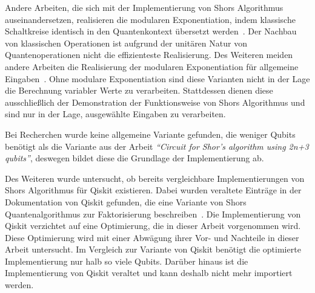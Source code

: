 Andere Arbeiten, die sich mit der Implementierung von Shors Algorithmus auseinandersetzen,
realisieren die modularen Exponentiation, 
indem klassische Schaltkreise identisch in den Quantenkontext übersetzt werden~\cite{Vedral_1996}.
Der Nachbau von klassischen Operationen ist aufgrund der unitären Natur von Quantenoperationen nicht die effizienteste Realisierung.
Des Weiteren meiden andere Arbeiten die Realisierung der modularen Exponentiation für allgemeine Eingaben~\cite{9376169,9686492}. 
Ohne modulare Exponentiation sind diese Varianten nicht in der Lage die Berechnung variabler Werte zu verarbeiten.
Stattdessen dienen diese ausschließlich der Demonstration der Funktionsweise von Shors Algorithmus und
sind nur in der Lage, ausgewählte Eingaben zu verarbeiten.

Bei Recherchen wurde keine allgemeine Variante gefunden,
die weniger Qubits benötigt als die Variante aus der Arbeit \textit{"`Circuit for Shor’s algorithm using 2n+3 qubits"'},
deswegen bildet diese die Grundlage der Implementierung ab.

Des Weiteren wurde untersucht, 
ob bereits vergleichbare Implementierungen von Shors Algorithmus für Qiskit existieren. 
Dabei wurden veraltete Einträge in der Dokumentation von Qiskit gefunden, 
die eine Variante von Shors Quantenalgorithmus zur Faktorisierung beschreiben~\cite{QiskitShorImplementations}. 
Die Implementierung von Qiskit verzichtet auf eine Optimierung, die in dieser Arbeit vorgenommen wird. 
Diese Optimierung wird mit einer Abwägung ihrer Vor- und Nachteile in dieser Arbeit untersucht. 
Im Vergleich zur Variante von Qiskit benötigt die optimierte Implementierung nur halb so viele Qubits. 
Darüber hinaus ist die Implementierung von Qiskit veraltet und kann deshalb nicht mehr importiert werden.
